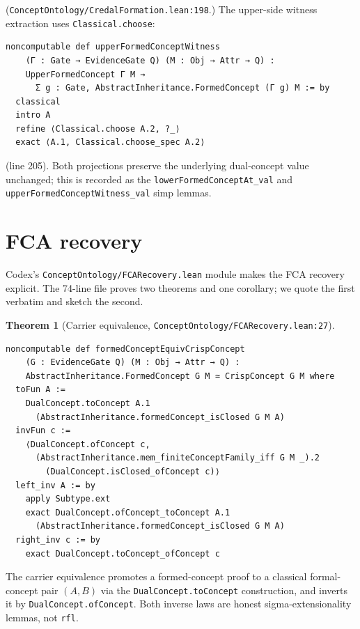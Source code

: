 \documentclass[]{article}
\newtheorem{theorem}{Theorem}
\newcommand{\lid}[1]{{\ttfamily\nolinkurl{#1}}}
\newcommand{\lpath}[1]{\texttt{\nolinkurl{#1}}}
\begin{document}
\noindent (\lpath{ConceptOntology/CredalFormation.lean:198}.) The upper-side
witness extraction uses \lid{Classical.choose}:

\begin{lstlisting}
noncomputable def upperFormedConceptWitness
    (Γ : Gate → EvidenceGate Q) (M : Obj → Attr → Q) :
    UpperFormedConcept Γ M →
      Σ g : Gate, AbstractInheritance.FormedConcept (Γ g) M := by
  classical
  intro A
  refine ⟨Classical.choose A.2, ?_⟩
  exact ⟨A.1, Classical.choose_spec A.2⟩
\end{lstlisting}

\noindent (line 205). Both projections preserve the underlying dual-concept value
unchanged; this is recorded as the \lid{lowerFormedConceptAt\_val} and
\lid{upperFormedConceptWitness\_val} simp lemmas.

\section{FCA recovery}\label{sec:fca-recovery}

Codex's \lpath{ConceptOntology/FCARecovery.lean} module makes the FCA recovery
explicit. The 74-line file proves two theorems and one corollary; we quote the
first verbatim and sketch the second.

\begin{theorem}[Carrier equivalence,
\lpath{ConceptOntology/FCARecovery.lean:27}]\label{thm:fca-carrier}
\begin{lstlisting}
noncomputable def formedConceptEquivCrispConcept
    (G : EvidenceGate Q) (M : Obj → Attr → Q) :
    AbstractInheritance.FormedConcept G M ≃ CrispConcept G M where
  toFun A :=
    DualConcept.toConcept A.1
      (AbstractInheritance.formedConcept_isClosed G M A)
  invFun c :=
    ⟨DualConcept.ofConcept c,
      (AbstractInheritance.mem_finiteConceptFamily_iff G M _).2
        (DualConcept.isClosed_ofConcept c)⟩
  left_inv A := by
    apply Subtype.ext
    exact DualConcept.ofConcept_toConcept A.1
      (AbstractInheritance.formedConcept_isClosed G M A)
  right_inv c := by
    exact DualConcept.toConcept_ofConcept c
\end{lstlisting}
\end{theorem}

\noindent The carrier equivalence promotes a formed-concept proof to a classical
formal-concept pair $(A, B)$ via the \lid{DualConcept.toConcept} construction, and
inverts it by \lid{DualConcept.ofConcept}. Both inverse laws are honest
sigma-extensionality lemmas, not \lid{rfl}.
\end{document}
